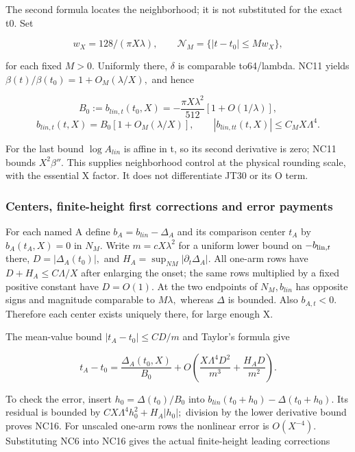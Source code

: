 The second formula locates the neighborhood; it is not substituted for the exact t0. Set

\[
w_X=128/(\pi X\lambda),\qquad
\mathcal N_M=\{|t-t_0|\le M w_X\},
\tag{NC14}\label{eq:ansatz-nc14}
\]

for each fixed \(M>0.\) Uniformly there, \(\delta\) is comparable to64/lambda. NC11 yields \(\beta(t)/\beta(t_{0})=1+O_{M}(\lambda/X),\) and hence

\[
B_0:=b_{lin,t}(t_0,X)
 =-\frac{\pi X\lambda^2}{512}[1+O(1/\lambda)],
\]
\[
b_{lin,t}(t,X)=B_0[1+O_M(\lambda/X)],\qquad
|b_{lin,tt}(t,X)|\le C_M X\Lambda^4.
\tag{NC15}\label{eq:ansatz-nc15}
\]

For the last bound \(\log A_{lin}\) is affine in t, so its second derivative is zero; NC11 bounds \(X^{2} \beta''.\) This supplies neighborhood control at the physical rounding scale, with the essential X factor. It does not differentiate JT30 or its O term.

\subsubsection{Centers, finite-height first corrections and error payments}
\label{subsec:nc-4}

For each named A define \(b_{A}=b_{lin}-\Delta_{A}\) and its comparison center \(t_{A}\) by \(b_{A}(t_{A},X)=0\) in \(N_{M}.\) Write \(m=c X \lambda^{2}\) for a uniform lower bound on \(-b_{{\rm lin},t}\) there, \(D=|\Delta_{A}(t_{0})|,\) and \(H_{A}=\sup_{NM} |\partial_t\Delta_A|.\) All one-arm rows have \(D+H_{A}\le C \Lambda/X\) after enlarging the onset; the same rows multiplied by a fixed positive constant have \(D=O(1).\) At the two endpoints of \(N_{M}, b_{lin}\) has opposite signs and magnitude comparable to \(M \lambda,\) whereas \(\Delta\) is bounded. Also \(b_{A,t}<0.\) Therefore each center exists uniquely there, for large enough X.

The mean-value bound \(|t_{A}-t_{0}|\le C D/m\) and Taylor's formula give

\[
\boxed{t_A-t_0=\frac{\Delta_A(t_0,X)}{B_0}
 +O\left(\frac{X\Lambda^4D^2}{m^3}
                    +\frac{H_AD}{m^2}\right).}
\tag{NC16}\label{eq:ansatz-nc16}
\]

To check the error, insert \(h_{0}=\Delta(t_{0})/B_{0}\) into \(b_{lin}(t_{0}+h_{0})-\Delta(t_{0}+h_{0}).\) Its residual is bounded by \(C X \Lambda^{4} h_{0}^{2}+H_{A}|h_{0}|;\) division by the lower derivative bound proves NC16. For unscaled one-arm rows the nonlinear error is \(O(X^{-4}).\) Substituting NC6 into NC16 gives the actual finite-height leading corrections

